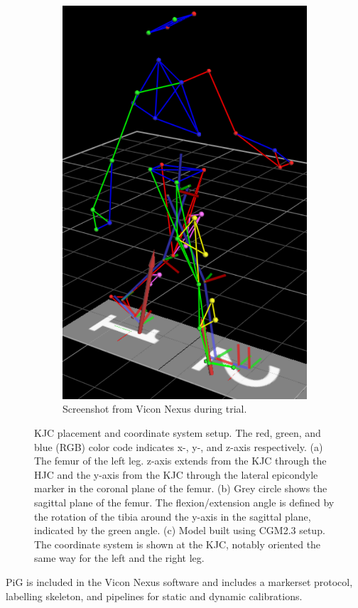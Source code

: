 \documentclass[../main.tex]{subfiles}
\begin{document}
\begin{figure}[!htb]
\begin{subfigure}[t]{0.3\textwidth}
        \includegraphics[width=\textwidth]{img/experiment_capture2.pdf}
        \caption{Screenshot from Vicon Nexus during trial.}
        \label{fig:A-cgm23-markerset-experiment-capture}
    \end{subfigure}
    \caption{\Ac{KJC} placement and coordinate system setup. The red, green, and blue (RGB) color code indicates x-, y-, and z-axis respectively. (a) The femur of the left leg. z-axis extends from the \ac{KJC} through the \ac{HJC} and the y-axis from the \ac{KJC} through the lateral epicondyle marker in the coronal plane of the femur. (b) Grey circle shows the sagittal plane of the femur. The flexion/extension angle is defined by the rotation of the tibia around the y-axis in the sagittal plane, indicated by the green angle. (c) Model built using CGM2.3 setup. The coordinate system is shown at the \ac{KJC}, notably oriented the same way for the left and the right leg.}
    \label{fig:knee-joint-coordinates}
\end{figure}
\Ac{PiG} is included in the Vicon Nexus software and includes a markerset protocol, labelling skeleton, and pipelines for static and dynamic calibrations. 
\end{document}
